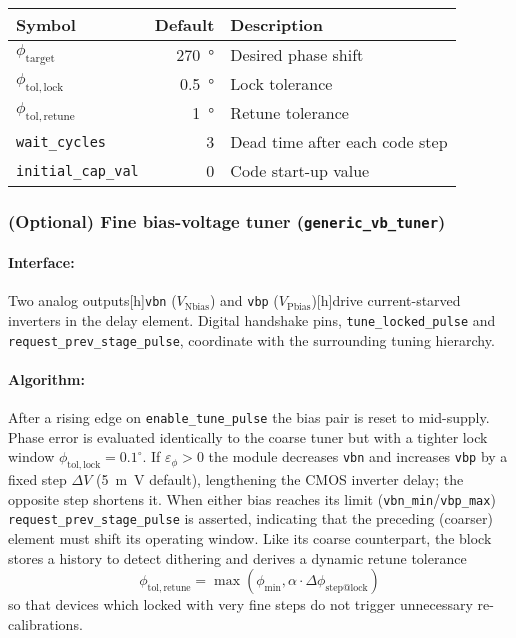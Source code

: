 \begin{center}
\begin{tabular}{@{}lrl@{}}
\toprule
Symbol & Default & Description\\
\midrule
\(\phi_\mathrm{target}\)              & \SI{270}{\degree} & Desired phase shift\\
\(\phi_\mathrm{tol,lock}\)            & \SI{0.5}{\degree} & Lock tolerance\\
\(\phi_\mathrm{tol,retune}\)          & \SI{1}{\degree}   & Retune tolerance \\[2pt]
\texttt{wait\_cycles}                 & 3                 & Dead time after each code step\\
\texttt{initial\_cap\_val}            & 0                 & Code start-up value\\
\bottomrule
\end{tabular}
\end{center}

\subsubsection{(Optional) Fine bias-voltage tuner (\texttt{generic\_vb\_tuner})}
\paragraph{Interface:}

Two analog
 outputs[h]\texttt{vbn} (\(V_\mathrm{N bias}\)) and \texttt{vbp} (\(V_\mathrm{P bias}\))[h]drive current-starved inverters in the delay element.
Digital handshake pins, \texttt{tune\_locked\_pulse} and
\texttt{request\_prev\_stage\_pulse}, coordinate with the surrounding
tuning hierarchy.

\paragraph{Algorithm:}

After a rising edge on \texttt{enable\_tune\_pulse} the bias pair is reset to mid-supply.
Phase error is evaluated identically to the coarse tuner but with a
tighter lock window \(\phi_\mathrm{tol,lock}=0.1^{\circ}\).
If \(\varepsilon_\phi>0\) the module decreases \texttt{vbn} and
increases \texttt{vbp} by a fixed step \(\Delta V\)
(\SI{5}{m\volt} default), lengthening the CMOS inverter delay;
the opposite step shortens it.
When either bias reaches its limit (\texttt{vbn\_min}/\texttt{vbp\_max})
\texttt{request\_prev\_stage\_pulse} is asserted, indicating that the
preceding (coarser) element must shift its operating window.
Like its coarse counterpart, the block stores a history to detect dithering and
derives a dynamic retune tolerance
\[
\phi_\mathrm{tol,retune}= \max\!\left(
                \phi_\mathrm{min},
                \alpha \cdot \Delta\!\phi_\mathrm{step@lock}
            \right)
\]
so that devices which locked with very fine steps do not trigger
unnecessary re-calibrations.


